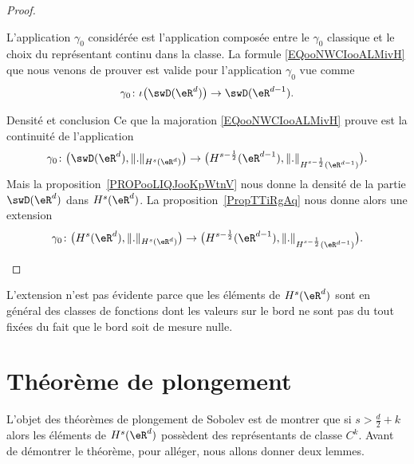 \begin{proof}
\begin{subproof}
            L'application \( \gamma_0\) considérée est l'application composée entre le \( \gamma_0\) classique et le choix du représentant continu dans la classe. La formule \eqref{EQooNWCIooALMivH} que nous venons de prouver est valide pour l'application \( \gamma_0\) vue comme
            \begin{equation}
                \gamma_0\colon \iota\big( \swD(\eR^d) \big)\to \swD(\eR^{d-1}).
            \end{equation}
        \item[Densité et conclusion]
            Ce que la majoration \eqref{EQooNWCIooALMivH} prouve est la continuité de l'application
            \begin{equation}
                \gamma_0\colon \big( \swD(\eR^d),\| . \|_{H^s(\eR^d)} \big)\to \big( H^{s-\frac{ 1 }{2}}(\eR^{d-1}),\| . \|_{H^{s-\frac{ 1 }{2}}(\eR^{d-1})} \big).
            \end{equation}
            Mais la proposition~\ref{PROPooLIQJooKpWtnV} nous donne la densité de la partie \( \swD(\eR^d)\) dans \( H^s(\eR^d)\). La proposition~\ref{PropTTiRgAq} nous donne alors une extension
            \begin{equation}
                \gamma_0\colon \big(   H^s(\eR^d), \| . \|_{H^s(\eR^d)}   \big)\to \big( H^{s-\frac{ 1 }{2}}(\eR^{d-1}),\| . \|_{H^{s-\frac{ 1 }{2}}(\eR^{d-1})} \big).
            \end{equation}
    \end{subproof}
\end{proof}

\begin{remark}
    L'extension n'est pas évidente parce que les éléments de \( H^s(\eR^d)\) sont en général des classes de fonctions dont les valeurs sur le bord ne sont pas du tout fixées du fait que le bord soit de mesure nulle.
\end{remark}

\section{Théorème de plongement}

L'objet des théorèmes de plongement de Sobolev est de montrer que si \( s>\frac{ d }{ 2 }+k\) alors les éléments de \( H^s(\eR^d)\) possèdent des représentants de classe \( C^k\). Avant de démontrer le théorème, pour alléger, nous allons donner deux lemmes.

